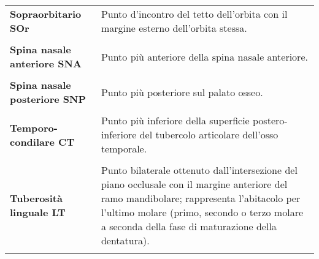 \begin{longtable}{>{\bfseries}p{5cm}X}
Sopraorbitario \newline SOr & Punto d'incontro del tetto dell'orbita con il margine esterno dell'orbita stessa.\\\\
Spina nasale anteriore \newline SNA & Punto più anteriore della spina nasale anteriore.\\\\
Spina nasale posteriore \newline SNP & Punto più posteriore sul palato osseo.\\\\
Temporo-condilare \newline CT & Punto più inferiore della superficie postero-inferiore del tubercolo articolare dell'osso temporale.\\\\
Tuberosità linguale \newline LT & Punto bilaterale ottenuto dall'intersezione del piano occlusale con il margine anteriore del ramo mandibolare; rappresenta l'abitacolo per l'ultimo molare (primo, secondo o terzo molare a seconda della fase di maturazione della dentatura).\\\\
\end{longtable}
